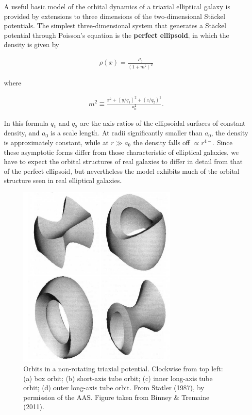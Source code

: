 \documentclass[a4paper,10pt]{article}
\begin{document}
{\noindent}A useful basic model of the orbital dynamics of a triaxial elliptical galaxy is provided by extensions to three dimensions of the two-dimensional St\"{a}ckel potentials. The simplest three-dimensional system that generates a St\"{a}ckel potential through Poisson's equation is the \textbf{perfect ellipsoid}, in which the density is given by

\begin{align*}
    \rho(x) = \frac{\rho_0}{(1+m^2)^2}
\end{align*}

{\noindent}where

\begin{align*}
    m^2 \equiv \frac{x^2+(y/q_1)^2+(z/q_2)^2}{a_0^2}.
\end{align*}

{\noindent}In this formula $q_1$ and $q_2$ are the axis ratios of the ellipsoidal surfaces of constant density, and $a_0$ is a scale length. At radii significantly smaller than $a_0$, the density is approximately constant, while at $r\gg a_0$ the density falls off $\propto r^{4-}$. Since these asymptotic forms differ from those characteristic of elliptical galaxies, we have to expect the orbital structures of real galaxies to differ in detail from that of the perfect ellipsoid, but nevertheless the model exhibits much of the orbital structure seen in real elliptical galaxies.

\begin{figure}[t!]
    \centering
    \includegraphics[width=8cm]{figures/TriaxialOrbits.png}
    \caption{\footnotesize{Orbits in a non-rotating triaxial potential. Clockwise from top left: (a) box orbit; (b) short-axis tube orbit; (c) inner long-axis tube orbit; (d) outer long-axis tube orbit. From Statler (1987), by permission of the AAS. Figure taken from Binney \& Tremaine (2011).}}
    \label{fig:triaxialorbits}
\end{figure}
\end{document}
